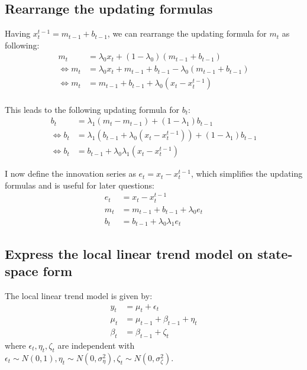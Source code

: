 \subsection{Rearrange the updating formulas}
Having $x^{t-1}_t = m_{t-1} + b_{t-1}$, we can rearrange the updating formula for $m_t$ as following:
\begin{equation}
\begin{split}
m_t &= \lambda_0 x_t + (1-\lambda_0)(m_{t-1}+b_{t-1}) \\
\Leftrightarrow m_t &= \lambda_0 x_t + m_{t-1}+b_{t-1} - \lambda_0(m_{t-1}+b_{t-1}) \\ 
\Leftrightarrow m_t &= m_{t-1} +  b_{t-1} + \lambda_0(x_t - x^{t-1}_t) \\
\end{split}
\end{equation}

This leads to the following updating formula for $b_t$:
\begin{equation}
\begin{split}
b_t &= \lambda_1(m_t - m_{t-1}) + (1-\lambda_1)b_{t-1} \\
\Leftrightarrow b_t &= \lambda_1(b_{t-1} +\lambda_0(x_t - x^{t-1}_t)) + (1-\lambda_1)b_{t-1}\\
\Leftrightarrow b_t &= b_{t-1} + \lambda_0\lambda_1 (x_t - x^{t-1}_t)
\end{split}
\end{equation}

I now define the innovation series as $e_t = x_t - x^{t-1}_t$, which simplifies the updating formulas and is useful for later questions:
\begin{equation} \label{eq:update_HW}
\begin{split}
e_t &= x_t - x^{t-1}_t\\
m_t &= m_{t-1} +  b_{t-1} + \lambda_0e_t\\
b_t &= b_{t-1} + \lambda_0\lambda_1 e_t
\end{split}
\end{equation}
\subsection{Express the local linear trend model on state-space form}
The local linear trend model is given by:
\begin{equation} \label{eq:llt}
\begin{split}
y_t &= \mu_t + \epsilon_t \\
\mu_t &= \mu_{t-1} + \beta_{t-1} + \eta_t\\
\beta_t &= \beta_{t-1} + \zeta_t
\end{split}
\end{equation}
where $\epsilon_t, \eta_t, \zeta_t$ are independent with $\epsilon_t \sim N(0, 1), \eta_t \sim N(0, \sigma_\eta^2), \zeta_t \sim N(0, \sigma_\zeta^2)$.

